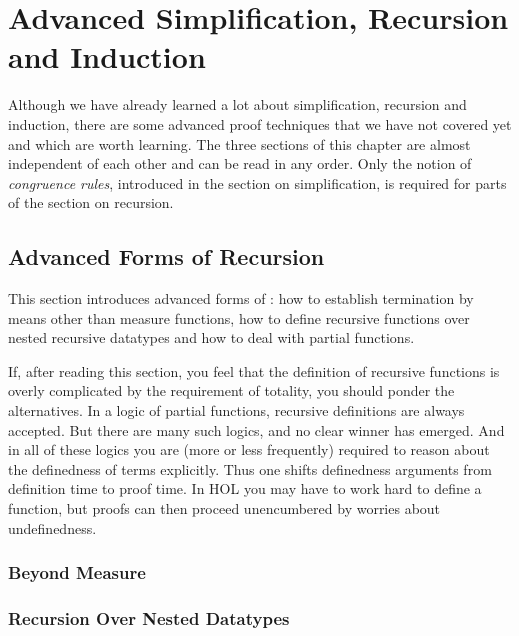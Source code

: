 \chapter{Advanced Simplification, Recursion and Induction}

Although we have already learned a lot about simplification, recursion and
induction, there are some advanced proof techniques that we have not covered
yet and which are worth learning. The three sections of this chapter are almost
independent of each other and can be read in any order. Only the notion of
\emph{congruence rules}, introduced in the section on simplification, is
required for parts of the section on recursion.



\section{Advanced Forms of Recursion}

This section introduces advanced forms of
: how to establish termination by means other than measure
functions, how to define recursive functions over nested recursive datatypes
and how to deal with partial functions.

If, after reading this section, you feel that the definition of recursive
functions is overly complicated by the requirement of
totality, you should ponder the alternatives.  In a logic of partial functions,
recursive definitions are always accepted.  But there are many
such logics, and no clear winner has emerged. And in all of these logics you
are (more or less frequently) required to reason about the definedness of
terms explicitly. Thus one shifts definedness arguments from definition time to
proof time. In HOL you may have to work hard to define a function, but proofs
can then proceed unencumbered by worries about undefinedness.

\subsection{Beyond Measure}
\label{sec:beyond-measure}


\subsection{Recursion Over Nested Datatypes}
\label{sec:nested-recdef}




